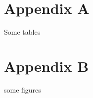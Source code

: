 \appendix
\addappheadtotoc
\setcounter{table}{0}
\renewcommand{\thetable}{A\arabic{table}}

\setcounter{figure}{0}
\renewcommand{\thefigure}{B\arabic{figure}}
 

\section{Appendix A}\label{appA}
Some tables
\section{Appendix B}\label{appB}
some figures